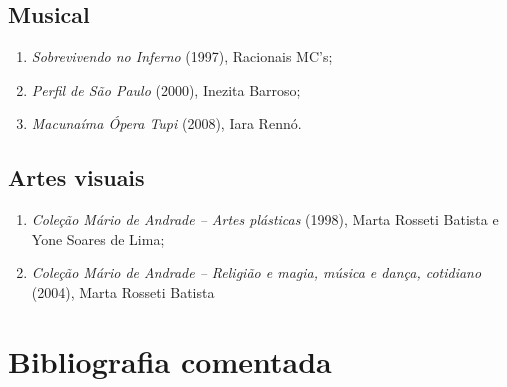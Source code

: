 \documentclass{article}
\begin{document}
\subsection{Musical}

\begin{enumerate}
\item
  \emph{Sobrevivendo no Inferno} (1997), Racionais MC's;
\item
  \emph{Perfil de São Paulo} (2000), Inezita Barroso;
\item
  \emph{Macunaíma Ópera Tupi} (2008), Iara Rennó.
\end{enumerate}

\subsection{Artes visuais}

\begin{enumerate}
\item
  \emph{Coleção Mário de Andrade -- Artes plásticas} (1998), Marta
  Rosseti Batista e Yone Soares de Lima;
\item
  \emph{Coleção Mário de Andrade -- Religião e magia, música e dança,
  cotidiano} (2004), Marta Rosseti Batista
\end{enumerate}

\section{Bibliografia comentada}
\end{document}
